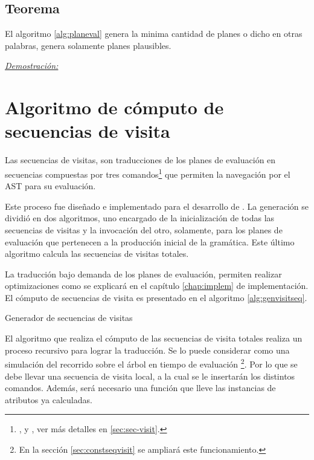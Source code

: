 \subsection{Teorema}
El algoritmo \ref{alg:planeval} genera la minima cantidad de planes o dicho en otras palabras, genera solamente planes plausibles.

\underline{\emph{Demostración:}}


\section{Algoritmo de cómputo de secuencias de visita}
\label{sec:algseqvisit}

Las secuencias de visitas, son traducciones de los planes de evaluación en secuencias compuestas por tres comandos\footnote{,  y , ver más detalles en \ref{sec:sec-visit}.} que permiten la navegación por el AST para su evaluación.

Este proceso fue diseñado e implementado para el desarrollo de \maggen. La generación se dividió en dos algoritmos, uno encargado de la inicialización de todas las secuencias de visitas y la invocación del otro, solamente, para los planes de evaluación que pertenecen a la producción inicial de la gramática. Este último algoritmo calcula las secuencias de visitas totales.

La traducción bajo demanda de los planes de evaluación, permiten realizar optimizaciones como se explicará en el capítulo \ref{chap:implem} de implementación. El cómputo de secuencias de visita es presentado en el algoritmo \ref{alg:genvisitseq}.

\begin{algorithm}[!ht]

\caption{\label{alg:genvisitseq} Generador de secuencias de visitas}
\end{algorithm}

El algoritmo que realiza el cómputo de las secuencias de visita totales realiza un proceso recursivo para lograr la traducción. Se lo puede considerar como una simulación del recorrido sobre el árbol en tiempo de evaluación \footnote{En la sección \ref{sec:constseqvisit} se ampliará este funcionamiento.}. Por lo que se debe llevar una secuencia de visita local, a la cual se le insertarán los distintos comandos. Además, será necesario una función que lleve las instancias de atributos ya calculadas.

